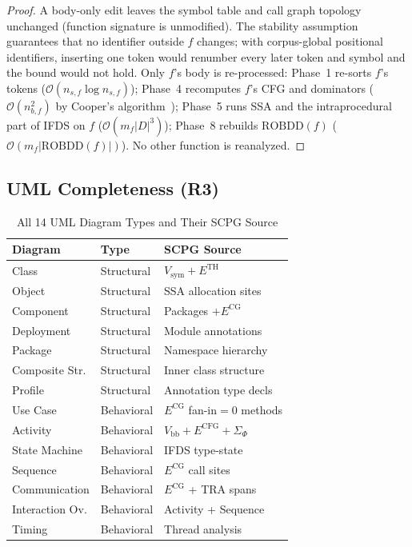 \documentclass[journal,10pt,twoside]{IEEEtran}
\newcommand{\VB}{V_{\!\mathrm{bb}}}
\newcommand{\VSYM}{V_{\!\mathrm{sym}}}
\newcommand{\ECFG}{E^{\mathrm{CFG}}}
\newcommand{\ECG}{E^{\mathrm{CG}}}
\newcommand{\ETH}{E^{\mathrm{TH}}}
\newcommand{\SigPhi}{\Sigma_{\!\Phi}}
\newcommand{\ROBDD}{\mathrm{ROBDD}}
\newcommand{\BigO}{\mathcal{O}}
\begin{document}
\begin{proof}
A body-only edit leaves the symbol table and call graph
topology unchanged (function signature is unmodified).  The
stability assumption guarantees that no identifier outside $f$
changes; with corpus-global positional identifiers, inserting
one token would renumber every later token and symbol and the
bound would not hold.
Only $f$'s body is re-processed: Phase~1 re-sorts $f$'s
tokens ($\BigO(n_{s,f}\log n_{s,f})$); Phase~4 recomputes
$f$'s CFG and dominators ($\BigO(n_{b,f}^2)$ by Cooper's
algorithm~\cite{cooper01}); Phase~5 runs SSA and the
intraprocedural part of IFDS on $f$ ($\BigO(m_f|D|^3)$);
Phase~8 rebuilds
$\ROBDD(f)$ ($\BigO(m_f|\ROBDD(f)|)$).  No other function
is reanalyzed.
\end{proof}

\subsection{UML Completeness (R3)}

\begin{table}[!t]
\renewcommand{\arraystretch}{1.2}
\caption{All 14 UML Diagram Types and Their SCPG Source}
\label{tab:uml}
\centering
\small
\begin{tabular}{@{}l@{\;}l@{\;}l@{}}
\toprule
\textbf{Diagram} & \textbf{Type} & \textbf{SCPG Source}\\
\midrule
Class          & Structural & $\VSYM + \ETH$\\
Object         & Structural & SSA allocation sites\\
Component      & Structural & Packages $+ \ECG$\\
Deployment     & Structural & Module annotations\\
Package        & Structural & Namespace hierarchy\\
Composite Str. & Structural & Inner class structure\\
Profile        & Structural & Annotation type decls\\
Use Case       & Behavioral & $\ECG$ fan-in$=0$ methods\\
Activity       & Behavioral & $\VB + \ECFG + \SigPhi$\\
State Machine  & Behavioral & IFDS type-state\\
Sequence       & Behavioral & $\ECG$ call sites\\
Communication  & Behavioral & $\ECG$ + TRA spans\\
Interaction Ov.& Behavioral & Activity + Sequence\\
Timing         & Behavioral & Thread analysis\\
\bottomrule
\end{tabular}
\end{table}
\end{document}
